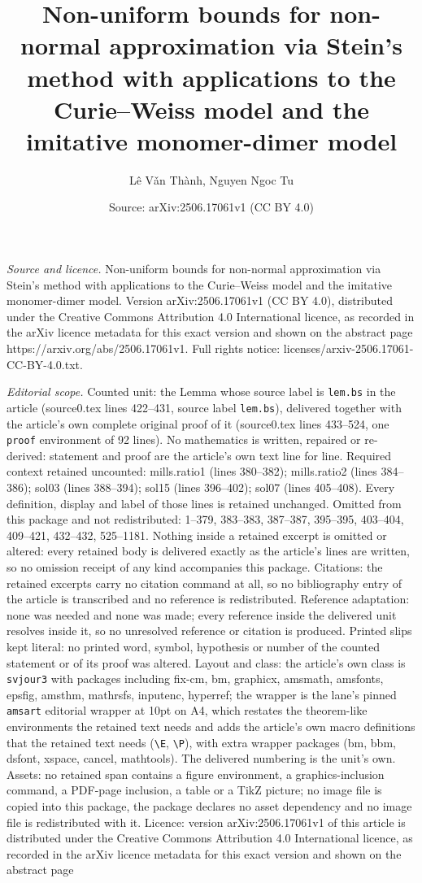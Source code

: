 \documentclass[10pt,a4paper]{amsart}
\title[Non-uniform bounds for non-normal approximation via Stein's ]{Non-uniform bounds for non-normal approximation via Stein's method with applications to the Curie--Weiss model and the imitative monomer-dimer model}
\author{L\^e V\v{a}n Th\`anh, Nguyen Ngoc Tu}
\date{Source: arXiv:2506.17061v1 (CC BY 4.0)}
\begin{document}
\maketitle

\noindent\emph{Source and licence.} Non-uniform bounds for non-normal approximation via Stein's method with applications to the Curie--Weiss model and the imitative monomer-dimer model. Version arXiv:2506.17061v1 (CC BY 4.0), distributed under the Creative Commons Attribution 4.0 International licence, as recorded in the arXiv licence metadata for this exact version and shown on the abstract page https://arxiv.org/abs/2506.17061v1. Full rights notice: licenses/arxiv-2506.17061-CC-BY-4.0.txt.\par\smallskip

\noindent\textit{Editorial scope.} Counted unit: the Lemma whose source label is \texttt{lem.bs} in the article (source0.tex lines 422--431, source label \texttt{lem.bs}), delivered together with the article's own complete original proof of it (source0.tex lines 433--524, one \texttt{proof} environment of 92 lines). No mathematics is written, repaired or re-derived: statement and proof are the article's own text line for line. Required context retained uncounted: mills.ratio1 (lines 380--382); mills.ratio2 (lines 384--386); sol03 (lines 388--394); sol15 (lines 396--402); sol07 (lines 405--408). Every definition, display and label of those lines is retained unchanged. Omitted from this package and not redistributed: 1--379, 383--383, 387--387, 395--395, 403--404, 409--421, 432--432, 525--1181. Nothing inside a retained excerpt is omitted or altered: every retained body is delivered exactly as the article's lines are written, so no omission receipt of any kind accompanies this package. Citations: the retained excerpts carry no citation command at all, so no bibliography entry of the article is transcribed and no reference is redistributed. Reference adaptation: none was needed and none was made; every reference inside the delivered unit resolves inside it, so no unresolved reference or citation is produced. Printed slips kept literal: no printed word, symbol, hypothesis or number of the counted statement or of its proof was altered. Layout and class: the article's own class is \texttt{svjour3} with packages including fix-cm, bm, graphicx, amsmath, amsfonts, epsfig, amsthm, mathrsfs, inputenc, hyperref; the wrapper is the lane's pinned \texttt{amsart} editorial wrapper at 10pt on A4, which restates the theorem-like environments the retained text needs and adds the article's own macro definitions that the retained text needs (\texttt{\textbackslash E}, \texttt{\textbackslash P}), with extra wrapper packages (bm, bbm, dsfont, xspace, cancel, mathtools). The delivered numbering is the unit's own. Assets: no retained span contains a figure environment, a graphics-inclusion command, a PDF-page inclusion, a table or a TikZ picture; no image file is copied into this package, the package declares no asset dependency and no image file is redistributed with it. Licence: version arXiv:2506.17061v1 of this article is distributed under the Creative Commons Attribution 4.0 International licence, as recorded in the arXiv licence metadata for this exact version and shown on the abstract page 
\end{document}
